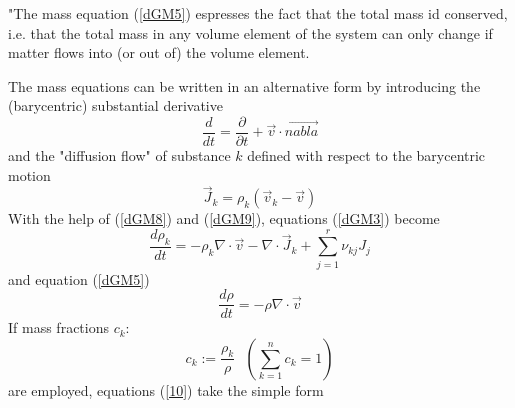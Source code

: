 "The mass equation (\ref{dGM5}) espresses the fact that the total mass id conserved, i.e. that the total mass in any volume element of the system can only change if matter flows into (or out of) the volume element.

The mass equations can be written in an alternative form by introducing the (barycentric) substantial derivative
\begin{equation}
\frac{d}{dt} = \frac{\partial}{\partial t} + \vec{v} \cdot \vec{nabla}
\label{dGM8}
\end{equation}
and the "diffusion flow" of substance $k$ defined with respect to the barycentric motion
\begin{equation}
\vec{J}_k = \rho_k (\vec{v}_k - \vec{v})
\label{dGM9}
\end{equation}
With the help of (\ref{dGM8}) and (\ref{dGM9}), equations (\ref{dGM3}) become
\begin{equation}
\frac{d \rho_k}{dt} = - \rho_k \nabla \cdot \vec{v} - \nabla \cdot \vec{J}_k + \sum_{j=1}^r \nu_{kj} J_j
\end{equation}
and equation (\ref{dGM5})
\begin{equation}
\frac{d \rho}{dt} = - \rho \nabla \cdot \vec{v}
\end{equation}
If mass fractions $c_k$:
\begin{equation}
c_k := \frac{\rho_k}{\rho} \ \ \ \left( \sum_{k=1}^n c_k =1 \right)
\end{equation}
are employed, equations (\ref{10}) take the simple form
